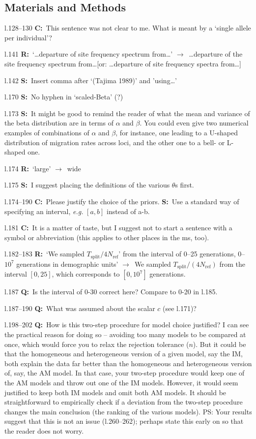 \documentclass[11pt]{article}
\newenvironment{my_description}
{\begin{description}
  \setlength{\itemsep}{2pt}
  \setlength{\parskip}{0pt}
  \setlength{\parsep}{0pt}}
{\end{description}}
\newcommand{\ra}{$\rightarrow$\ }
\newcommand{\C}{\textbf{C:}\ }
\newcommand{\Q}{\textbf{Q:}\ }
\newcommand{\R}{\textbf{R:}\ }
\newcommand{\V}{\textbf{S:}\ }
\begin{document}
\subsection{Materials and Methods}

\begin{my_description}
	\item[l.128--130] \C This sentence was not clear to me. What is meant by a `single allele per individual'?
	\item[l.141] \R `\dots departure of site frequency spectrum from\dots' \ra \dots departure of the site frequency spectrum from\dots [or: \dots departure of site frequency spectra from\dots]
	\item[l.142] \V Insert comma after `(Tajima 1989)' and 'using\dots'
	\item[l.170] \V No hyphen in `scaled-Beta' (?)
	\item[l.173] \V It might be good to remind the reader of what the mean and variance of the beta distribution are in terms of $\alpha$ and $\beta$. You could even give two numerical examples of combinations of $\alpha$ and $\beta$, for instance, one leading to a U-shaped distribution of migration rates across loci, and the other one to a bell- or L-shaped one.
	\item[l.174] \R `large' \ra wide
	\item[l.175] \V I suggest placing the definitions of the various $\theta$s first.
	\item[l.174--190] \C Please justify the choice of the priors. \V Use a standard way of specifying an interval, \emph{e.g.} $[a, b]$ instead of a-b.
	\item[l.181] \C It is a matter of taste, but I suggest not to start a sentence with a symbol or abbreviation (this applies to other places in the ms, too).
	\item[l.182--183] \R `We sampled $T_\mathrm{split}/4 N_\mathrm{ref}$' from the interval of 0--25 generations, 0--$10^{7}$ generations in demographic units' \ra We sampled $T_\mathrm{split}/(4 N_\mathrm{ref})$ from the interval $[0,25]$, which corresponds to $[0,10^{7}]$ generations.
	\item[l.187] \Q Is the interval of 0-30 correct here? Compare to 0-20 in l.185.
	\item[l.187--190] \Q What was assumed about the scalar $c$ (see l.171)?
	\item[l.198--202] \Q How is this two-step procedure for model choice justified? I can see the practical reason for doing so -- avoiding too many models to be compared at once, which would force you to relax the rejection tolerance ($n$). But it could be that the homogeneous and heterogeneous version of a given model, say the IM, both explain the data far better than the homogeneous and heterogeneous version of, say, the AM model. In that case, your two-step procedure would keep one of the AM models and throw out one of the IM models. However, it would seem justified to keep both IM models and omit both AM models. It should be straightforward to empirically check if a deviation from the two-step procedure changes the main conclusion (the ranking of the various models). PS: Your results suggest that this is not an issue (l.260--262); perhaps state this early on so that the reader does not worry.

\end{my_description}
\end{document}
